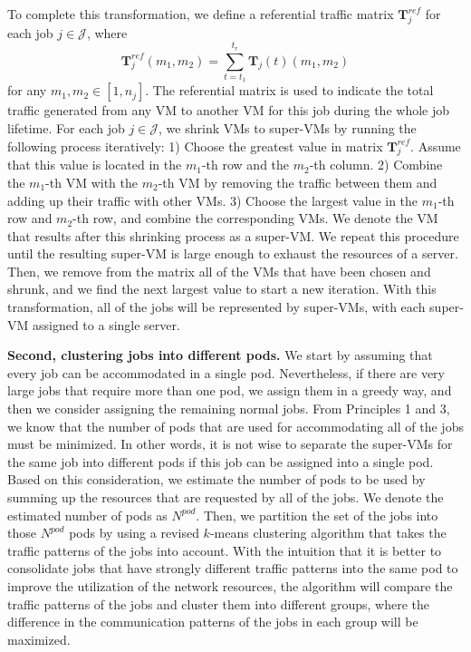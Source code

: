 \documentclass[journal,single-space,two column,twoside,10pt]{IEEEtran}
\begin{document}
To complete this transformation, we define a referential traffic matrix $\mathbf{T}_j^{ref}$ for each job $j \in \mathcal{J}$, where
\begin{equation}
	\mathbf{T}_j^{ref}(m_1,m_2) = \sum_{t = t_1}^{t_r} \mathbf{T}_j(t)(m_1,m_2)
\end{equation}
for any $ m_1,m_2 \in [1,n_j]$. The referential matrix is used to indicate the total traffic generated from any VM to another VM for this job during the whole job lifetime.
For each job $j \in \mathcal{J}$, we shrink VMs to super-VMs by running the following process iteratively: 1) Choose the greatest value in matrix $\mathbf{T}_j^{ref}$. Assume that this value is located in the $m_1$-th row and the $m_2$-th column. 2) Combine the $m_1$-th VM with the $m_2$-th VM by removing the traffic between them and adding up their traffic with other VMs. 3) Choose the largest value in the $m_1$-th row and $m_2$-th row, and combine the corresponding VMs. We denote the VM that results after this shrinking process as a super-VM. We repeat this procedure until the resulting super-VM is large enough to exhaust the resources of a server. Then, we remove from the matrix all of the VMs that have been chosen and shrunk, and we find the next largest value to start a new iteration. With this transformation, all of the jobs will be represented by super-VMs, with each super-VM assigned to a single server.

\textbf{Second, clustering jobs into different pods.} We start by assuming that every job can be accommodated in a single pod. Nevertheless, if there are very large jobs that require more than one pod, we assign them in a greedy way, and then we consider assigning the remaining normal jobs. From Principles 1 and 3, we know that the number of pods that are used for accommodating all of the jobs must be minimized. In other words, it is not wise to separate the super-VMs for the same job into different pods if this job can be assigned into a single pod. Based on this consideration, we estimate the number of pods to be used by summing up the resources that are requested by all of the jobs. We denote the estimated number of pods as $N^{pod}$. Then, we partition the set of the jobs into those $N^{pod}$ pods by using a revised $k$-means clustering algorithm that takes the traffic patterns of the jobs into account. With the intuition that it is better to consolidate jobs that have strongly different traffic patterns into the same pod to improve the utilization of the network resources, the algorithm will compare the traffic patterns of the jobs and cluster them into different groups, where the difference in the communication patterns of the jobs in each group will be maximized.
\end{document}
